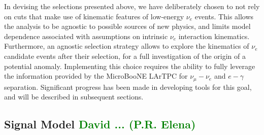 \documentclass[a4paper]{article}
\begin{document}
\par %
In devising the selections presented above, we have deliberately chosen to not rely on cuts that make use of kinematic features of low-energy $\nu_e$ events. This allows the analysis to be agnostic to possible sources of new physics, and limits model dependence associated with assumptions on intrinsic $\nu_e$ interaction kinematics. Furthermore, an agnostic selection strategy allows to explore the kinematics of $\nu_e$ candidate events after their selection, for a full investigation of the origin of a potential anomaly. Implementing this choice requires the ability to fully leverage the information provided by the MicroBooNE LArTPC for $\nu_{\mu}-\nu_e$ and $e-\gamma$ separation. Significant progress has been made in developing tools for this goal, and will be described in subsequent sections. 




\subsection{Signal Model \textcolor{green}{David  ... (P.R. Elena) }}

\end{document}
